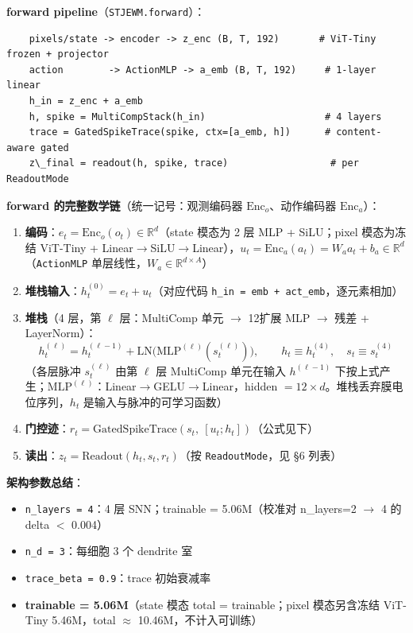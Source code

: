 \documentclass[11pt,a4paper]{article}
\begin{document}
\textbf{forward pipeline}（\texttt{STJEWM.forward}）：
\begingroup\scriptsize
\begin{verbatim}
    pixels/state -> encoder -> z_enc (B, T, 192)       # ViT-Tiny frozen + projector
    action        -> ActionMLP -> a_emb (B, T, 192)     # 1-layer linear
    h_in = z_enc + a_emb
    h, spike = MultiCompStack(h_in)                     # 4 layers
    trace = GatedSpikeTrace(spike, ctx=[a_emb, h])      # content-aware gated
    z\_final = readout(h, spike, trace)                  # per ReadoutMode
\end{verbatim}
\endgroup

\textbf{forward 的完整数学链}（统一记号：观测编码器 $\mathrm{Enc}_o$、动作编码器 $\mathrm{Enc}_a$）：
\begin{enumerate}[leftmargin=2em]
    \item \textbf{编码}：$e_t = \mathrm{Enc}_o(o_t) \in \mathbb{R}^d$（state 模态为 2 层 MLP + SiLU；pixel 模态为冻结 ViT-Tiny + Linear$\to$SiLU$\to$Linear），$u_t = \mathrm{Enc}_a(a_t) = W_a a_t + b_a \in \mathbb{R}^d$（\texttt{ActionMLP} 单层线性，$W_a \in \mathbb{R}^{d \times A}$）
    \item \textbf{堆栈输入}：$h^{(0)}_t = e_t + u_t$（对应代码 \texttt{h\_in = emb + act\_emb}，逐元素相加）
    \item \textbf{堆栈}（4 层，第 $\ell$ 层：MultiComp 单元 $\to$ 12\texttimes{}扩展 MLP $\to$ 残差 + LayerNorm）：
    \[
    h^{(\ell)}_t = h^{(\ell-1)}_t + \mathrm{LN}\big(\mathrm{MLP}^{(\ell)}(s^{(\ell)}_t)\big),\qquad h_t \equiv h^{(4)}_t,\quad s_t \equiv s^{(4)}_t
    \]
    （各层脉冲 $s^{(\ell)}_t$ 由第 $\ell$ 层 MultiComp 单元在输入 $h^{(\ell-1)}$ 下按上式产生；$\mathrm{MLP}^{(\ell)}$：Linear$\to$GELU$\to$Linear，hidden $= 12 \times d$。堆栈丢弃膜电位序列，$h_t$ 是输入与脉冲的可学习函数）
    \item \textbf{门控迹}：$r_t = \mathrm{GatedSpikeTrace}(s_t,\ [u_t; h_t])$（公式见下）
    \item \textbf{读出}：$z_t = \mathrm{Readout}(h_t, s_t, r_t)$（按 \texttt{ReadoutMode}，见 §6 列表）
\end{enumerate}

\textbf{架构参数总结}：
\begin{itemize}[leftmargin=2em]
    \item \texttt{n\_layers = 4}：4 层 SNN；trainable = 5.06M（校准对 n\_layers=2 $\to$ 4 的 delta $<$ 0.004）
    \item \texttt{n\_d = 3}：每细胞 3 个 dendrite 室
    \item \texttt{trace\_beta = 0.9}：trace 初始衰减率
    \item \textbf{trainable = 5.06M}（state 模态 total = trainable；pixel 模态另含冻结 ViT-Tiny 5.46M，total $\approx$ 10.46M，不计入可训练）
\end{itemize}
\end{document}
